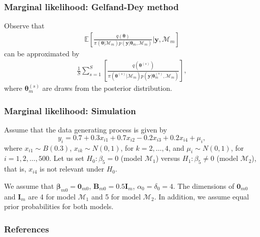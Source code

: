 \documentclass[12pt, compress]{beamer}
\begin{document}
\begin{frame}
	\frametitle{Marginal likelihood: Gelfand-Dey method}
Observe that
\begin{align*}
	\mathbb{E}\left[\frac{q(\bm{\theta})}{\pi(\bm{\theta}|\mathcal{M}_m)p(\bm{y}|\bm{\theta}_m,\mathcal{M}_m)}\biggr\rvert \bm{y},\mathcal{M}_m\right]
\end{align*} can be approximated by 
\begin{align*}
	\frac{1}{S}\sum_{s=1}^S \left[\frac{q(\bm{\theta}^{(s)})}{\pi(\bm{\theta}^{(s)}|\mathcal{M}_m)p(\bm{y}|\bm{\theta}^{(s)}_m,\mathcal{M}_m)}\right],
\end{align*}
where $\bm{\theta}^{(s)}_m$ are draws from the posterior distribution. 
\end{frame}

\begin{frame}
	\frametitle{Marginal likelihood:  Simulation}
Assume that the data generating process is given by  
\[
y_{i} = 0.7 + 0.3x_{i1} + 0.7x_{i2} - 0.2x_{i3} + 0.2x_{i4} + \mu_i,
\]
where \(x_{i1} \sim B(0.3)\), \(x_{ik} \sim N(0,1)\), for \(k = 2, \dots, 4\), and \(\mu_i \sim N(0, 1)\), for \(i = 1, 2, \dots, 500\). Let us set \(H_0: \beta_5 = 0\) (model \(\mathcal{M}_1\)) versus \(H_1: \beta_5 \neq 0\) (model \(\mathcal{M}_2\)), that is, $x_{i4}$ is not relevant under $H_0$.

We assume that \(\bm{\beta}_{m0} = \bm{0}_{m0}\), \(\bm{B}_{m0} = 0.5 \bm{I}_{m}\), \(\alpha_0 = \delta_0 = 4\). The dimensions of \(\bm{0}_{m0}\) and \(\bm{I}_m\) are 4 for model \(\mathcal{M}_1\) and 5 for model \(\mathcal{M}_2\). In addition, we assume equal prior probabilities for both models.
 
\end{frame}



\begin{frame}[allowframebreaks]
	\frametitle{References}
		{\footnotesize
		
		}
\end{frame}
\end{document}
